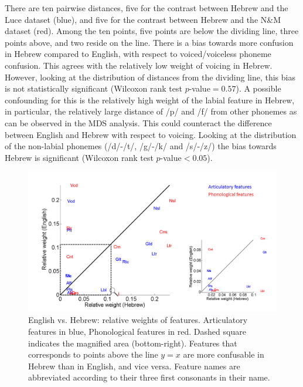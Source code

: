There are ten pairwise distances, five for the contrast between Hebrew and the Luce dataset (blue), and five for the contrast between Hebrew and the N\&M dataset (red). Among the ten points, five points are below the dividing line, three points above, and two reside on the line. There is a bias towards more confusion in Hebrew compared to English, with respect to voiced/voiceless phoneme confusion. This agrees with the relatively low weight of voicing in Hebrew. However, looking at the distribution of distances from the dividing line, this bias is not statistically significant (Wilcoxon rank test $p$-value$=0.57$). A possible confounding for this is the relatively high weight of the labial feature in Hebrew, in particular, the relatively large distance of /p/ and /f/ from other phonemes as can be observed in the MDS analysis. This could counteract the difference between English and Hebrew with respect to voicing. Looking at the distribution of the non-labial phonemes (/d/-/t/, /g/-/k/ and /s/-/z/) the bias towards Hebrew is significant (Wilcoxon rank test $p$-value$<0.05$).

\begin{figure}
\vspace{.3in}
\includegraphics[width=\linewidth]{Figures/Ch2/compare_Heb_Luce.PNG}
\caption{English vs. Hebrew: relative weights of features. Articulatory features in blue, Phonological features in red. Dashed square indicates the magnified area (bottom-right). Features that corresponds to points above the line $y=x$ are more confusable in Hebrew than in English, and vice versa. Feature names are abbreviated according to their three first consonants in their name.}
\end{figure}